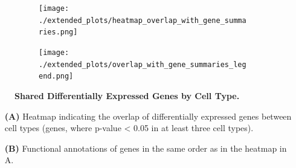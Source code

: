 \documentclass[12pt]{article}
\begin{document}
\begin{figure}[H] 
    \begin{subfigure}[t]{0.2\textwidth}
        \caption{}
        \texttt{[image: ./extended\_plots/heatmap\_overlap\_with\_gene\_summaries.png]}        
    \end{subfigure}   
    \begin{subfigure}[t]{0.8\textwidth}
        \caption{}
        \vspace{1cm}
        \texttt{[image: ./extended\_plots/overlap\_with\_gene\_summaries\_legend.png]}        
    \end{subfigure}   
    \caption{
        \textbf{Shared Differentially Expressed Genes by Cell Type.}\\
    }
    \label{fig:snRNAseq_gene_scores_2}
\end{figure}
\begin{itemize}
    \item[\textbf{(A)}] Heatmap indicating the overlap of differentially expressed genes between cell types (genes, where p-value < 0.05 in at least three cell types). 
    \item[\textbf{(B)}] Functional annotations of genes in the same order as in the heatmap in A.
\end{itemize} \clearpage
\end{document}
